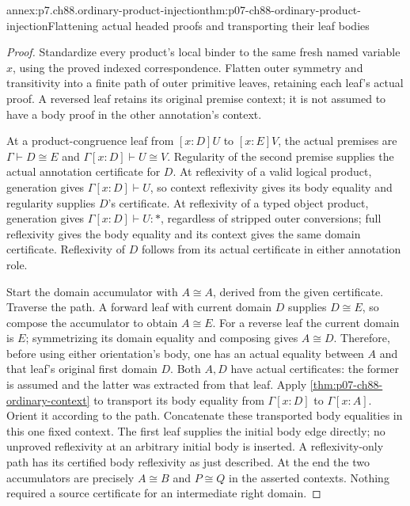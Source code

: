 \begin{annexitem}{annex:p7.ch88.ordinary-product-injection}{thm:p07-ch88-ordinary-product-injection}{Flattening actual headed proofs and transporting their leaf bodies}
\begin{proof}
Standardize every product's local binder to the same fresh named
variable \(x\), using the proved indexed correspondence. Flatten
outer symmetry and transitivity into a finite path of outer primitive
leaves, retaining each leaf's actual proof. A reversed leaf retains
its original premise context; it is not assumed to have a body proof
in the other annotation's context.

At a product-congruence leaf from \([x:D]U\) to \([x:E]V\),
the actual premises are \(\Gamma\vdash D\cong E\) and
\(\Gamma[x:D]\vdash U\cong V\). Regularity of the second
premise supplies the actual annotation certificate for \(D\).
At reflexivity of a valid logical product, generation gives
\(\Gamma[x:D]\vdash U\), so context reflexivity gives its body
equality and regularity supplies \(D\)'s certificate. At reflexivity
of a typed object product, generation gives
\(\Gamma[x:D]\vdash U:\ast\), regardless of stripped outer
conversions; full reflexivity gives the body equality and its context
gives the same domain certificate. Reflexivity of \(D\) follows
from its actual certificate in either annotation role.

Start the domain accumulator with \(A\cong A\), derived from
the given certificate. Traverse the path. A forward leaf with current
domain \(D\) supplies \(D\cong E\), so compose the accumulator
to obtain \(A\cong E\). For a reverse leaf the current domain
is \(E\); symmetrizing its domain equality and composing gives
\(A\cong D\). Therefore, before using either orientation's body,
one has an actual equality between \(A\) and that leaf's original
first domain \(D\). Both \(A,D\) have actual certificates: the
former is assumed and the latter was extracted from that leaf.
Apply \cref{thm:p07-ch88-ordinary-context} to transport its body
equality from \(\Gamma[x:D]\) to \(\Gamma[x:A]\). Orient it
according to the path. Concatenate these transported body equalities
in this one fixed context. The first leaf supplies the initial body
edge directly; no unproved reflexivity at an arbitrary initial body
is inserted. A reflexivity-only path has its certified body reflexivity
as just described. At the end the two accumulators are precisely
\(A\cong B\) and \(P\cong Q\) in the asserted contexts.
Nothing required a source certificate for an intermediate right domain.


\end{proof}
\end{annexitem}
